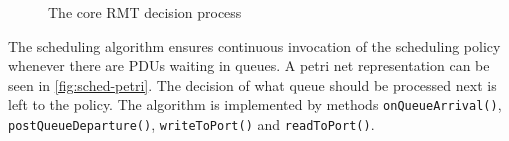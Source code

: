             \begin{figure}[H]
                \begin{center}
                  \caption{The core RMT decision process}
                  \label{fig:rmt-fsm}
                \end{center}
            \end{figure}

            The scheduling algorithm ensures continuous invocation of the scheduling policy whenever there are PDUs waiting in queues. A petri net representation can be seen in \ref{fig:sched-petri}. The decision of what queue should be processed next is left to the policy. The algorithm is implemented by methods \texttt{onQueueArrival()}, \texttt{postQueueDeparture()}, \texttt{writeToPort()} and \texttt{readToPort()}.

